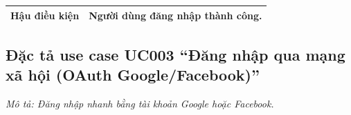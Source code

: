 \documentclass[../main.tex]{subfiles}
\begin{document}
\begin{longtable}{|p{2.7cm}|p{0.8cm}|p{2.6cm}|p{7.3cm}|}
\cellcolor[HTML]{D5F5E3}\textbf{Hậu điều kiện} & \multicolumn{3}{p{10.7cm}|}{Người dùng đăng nhập thành công.} \\ \hline
\end{longtable}
\endgroup

\subsection{Đặc tả use case UC003 ``Đăng nhập qua mạng xã hội (OAuth Google/Facebook)''}
\textit{Mô tả: Đăng nhập nhanh bằng tài khoản Google hoặc Facebook.}
\vspace{0.5cm}

\begingroup
\renewcommand{\arraystretch}{1.5}

\end{document}
